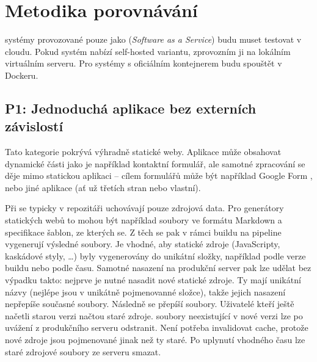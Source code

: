     \section{Metodika porovnávání}
        \blind[4]

        \CICD systémy provozované pouze jako  (\textit{Software as a Service}) budu muset testovat v cloudu. Pokud systém nabízí self-hosted variantu, zprovozním ji na lokálním virtuálním serveru. Pro systémy s oficiálním kontejnerem budu \CICD spouštět v Dockeru.


        \subsection{P1: Jednoduchá aplikace bez externích závislostí}
            Tato kategorie pokrývá výhradně statické weby. Aplikace může obsahovat dynamické části jako je například kontaktní formulář, ale samotné zpracování se děje mimo statickou aplikaci -- cílem formulářů může být například Google Form \cite{mccoy-google-form}, nebo jiné aplikace (ať už třetích stran nebo vlastní).


            Při \CICD se typicky v repozitáři uchovávají pouze zdrojová data. Pro generátory statických webů to mohou být například soubory ve formátu Markdown a specifikace \HTML šablon, ze kterých se. Z těch se pak v rámci buildu na \CICD pipeline vygenerují výsledné \HTML soubory. Je vhodné, aby statické zdroje (JavaScripty, kaskádové styly, \ldots) byly vygenerovány do unikátní složky, například podle verze buildu nebo podle času. Samotné nasazení na produkční server pak lze udělat bez výpadku takto: nejprve je nutné nasadit nové statické zdroje. Ty mají unikátní názvy (nejlépe jsou v unikátně pojmenovanné složce), takže jejich nasazení nepřepíše současné soubory. Následně se přepíší \HTML soubory. Uživatelé kteří ještě načetli starou verzi načtou staré zdroje. \HTML soubory neexistující v nové verzi lze po uvážení z produkčního serveru odstranit. Není potřeba invalidovat cache, protože nové zdroje jsou pojmenované jinak než ty staré. Po uplynutí vhodného času lze staré zdrojové soubory ze serveru smazat.


